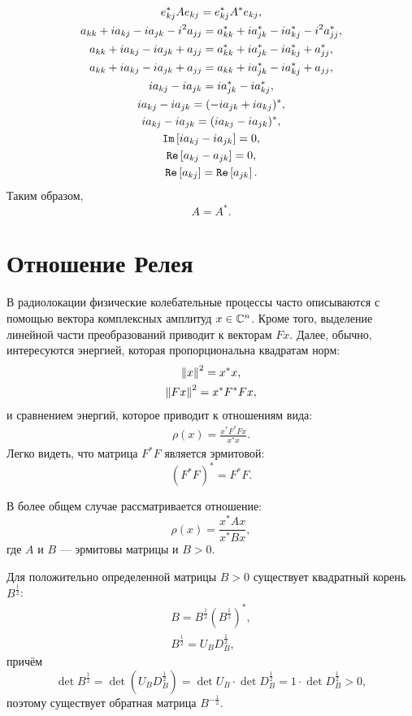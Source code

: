 \begin{gather*}
    e_{kj}^* A e_{kj} = e_{kj}^* A^* e_{kj} , \\
    a_{kk} + i a_{kj} - i a_{jk} - i^2 a_{jj} = a_{kk}^* + i a_{jk}^* - i a_{kj}^* - i^2 a_{jj}^* , \\
    a_{kk} + i a_{kj} - i a_{jk} + a_{jj} = a_{kk}^* + i a_{jk}^* - i a_{kj}^* + a_{jj}^* , \\
    a_{kk} + i a_{kj} - i a_{jk} + a_{jj} = a_{kk} + i a_{jk}^* - i a_{kj}^* + a_{jj} , \\
    i a_{kj} - i a_{jk} = i a_{jk}^* - i a_{kj}^* , \\
    i a_{kj} - i a_{jk} = ( - i a_{jk} + i a_{kj} )^* , \\
    i a_{kj} - i a_{jk} = ( i a_{kj} - i a_{jk})^* , \\
    \mathtt{Im} \left [ i a_{kj} - i a_{jk} \right ] = 0 , \\
    \mathtt{Re} \left [ a_{kj} - a_{jk} \right ] = 0 , \\
    \mathtt{Re} \left [ a_{kj} \right ] = \mathtt{Re} \left [ a_{jk} \right ] .
\end{gather*}
Таким образом,
\[
    A = A^*.
\]


\section{Отношение Релея}

В радиолокации физические колебательные процессы часто описываются с помощью вектора комплексных амплитуд $x \in \mathbb{C}^{n}$. Кроме того, выделение линейной части
преобразований приводит к векторам $Fx$. Далее, обычно, интересуются энергией, которая пропорциональна квадратам норм:
\begin{gather*}
    \left \| x \right \|^2 = x^* x , \\
    \left \| F x \right \|^2 = x^* F^* F x ,
\end{gather*}
и сравнением энергий, которое приводит к отношениям вида:
\begin{gather*}
    \rho(x) = \frac{x^* F^* F x}{x^* x}.
\end{gather*}
Легко видеть, что матрица $F^* F$ является эрмитовой:
\[
    ( F^* F )^* = F^* F .
\]

В более общем случае рассматривается отношение:
\[
    \rho(x) = \frac{x^* A x}{x^* B x},
\]
где $A$ и $B$ --- эрмитовы матрицы и $B > 0$.

Для положительно определенной матрицы $B > 0$ существует квадратный корень $B^\frac{1}{2}$:
\begin{gather*}
    B = B^\frac{1}{2} ( B^\frac{1}{2} )^* , \\
    B^\frac{1}{2} = U_B D_B^\frac{1}{2} ,
\end{gather*}
причём
\[
    \det B^\frac{1}{2}
    = \det ( U_B D_B^\frac{1}{2} )
    = \det U_B \cdot \det D_B^\frac{1}{2}
    = 1 \cdot \det D_B^\frac{1}{2}
    > 0 ,
\]
поэтому существует обратная матрица $B^{-\frac{1}{2}}$.

